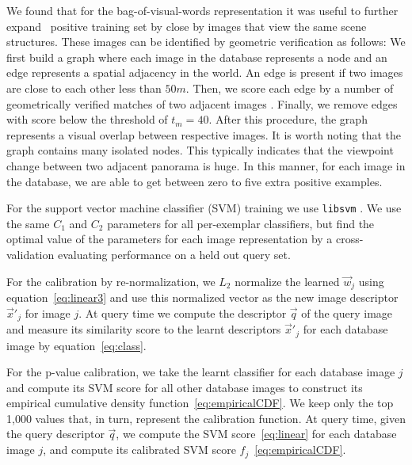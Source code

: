       We found that for the bag-of-visual-words representation it was useful to further expand~\cite{Chum07b} positive training set by close by images that view the same scene structures. These images can be identified by geometric verification \cite{Philbin07} \textcolor{petr} {as follows:}
      \textcolor{petr}{
      We first build a graph where each image in the database represents a node and an edge represents a spatial adjacency in the world. An edge is present if two images are close to each other less than $50m$.
      Then, we score each edge by a number of geometrically verified matches of two adjacent images \cite{Philbin07}. Finally, we remove edges with score below the threshold of $t_m = 40$. After this procedure, the graph represents a visual overlap between respective images. It is worth noting that the graph contains many isolated nodes. This typically indicates that the viewpoint change between two adjacent panorama is huge. In this manner, for each image in the database, we are able to get between zero to five extra positive examples.
      }

      For the support vector machine classifier (SVM) training we use {\tt libsvm} \cite{libsvm}. We use the same $C_1$ and $C_2$ parameters for all per-exemplar classifiers, but find the optimal value of the parameters for each image representation by a cross-validation evaluating performance on a held out query set.

      For the calibration by re-normalization, we $L_2$ normalize the learned $\vec{w}_j$ using equation~\eqref{eq:linear3} and use this normalized vector as the new image descriptor $\vec{x}'_j$ for image $j$. At query time we compute the descriptor $\vec{q}$ of the query image and measure its similarity score to the learnt descriptors $\vec{x}'_j$ for each database image by equation~\eqref{eq:class}.

      For the p-value calibration, we take the learnt classifier for each database image $j$ and compute its SVM score for all other database images to construct its empirical cumulative density function~\eqref{eq:empiricalCDF}. We keep only the top 1,000 values that, in turn, represent the calibration function. At query time, given the query descriptor $\vec{q}$, we compute the SVM score~\eqref{eq:linear} for each database image $j$, and compute its calibrated SVM score $f_j$~\eqref{eq:empiricalCDF}.


